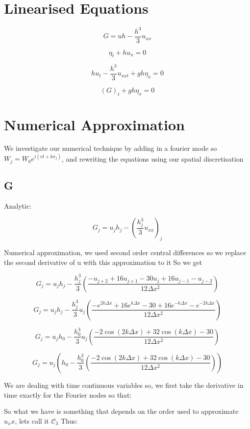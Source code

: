 \documentclass[12pt]{article}
\begin{document}
\section{Linearised Equations}



\[G = uh  -  \frac{h^3}{3} u_{xx}\]

\[\eta_t + h u_x = 0\]

\[h u_t - \frac{h^3}{3} u_{xxt}  + gh \eta_x  = 0\]

\[ \left(G\right)_t  + gh \eta_x  = 0\]

\section{Numerical Approximation}

We investigate our numerical technique by adding in a fourier mode so $W_j = W_0 e^{ i\left(vt + kx_j\right)}$, and rewriting the equations using our spatial discretisation

\subsection{G}

Analytic:

\[G_j = u_jh _j  -  (\frac{h_j^3}{3} {u_{xx}})_j\]

Numerical approximation, we used second order central differences so we replace the second derivative of u with this approximation to it
So we get

\[G_j = u_jh _j  -  \frac{h_j^3}{3} \left(\dfrac{-u_{j+2} + 16u_{j+1} - 30 u_{j} +16 u_{j-1} - u_{j-2}}{12\Delta x^2}\right)\]

\[G_j = u_jh _j  -  \frac{h_j^3}{3}u_j \left(\dfrac{-e^{2k\Delta x} + 16e^{k\Delta x} - 30 +16 e^{-k\Delta x} - e^{-2k\Delta x}}{12\Delta x^2}\right)\]

\[G_j = u_jh _0  -  \frac{h_0^3}{3}u_j \left(\dfrac{-2\cos\left(2k\Delta x\right) + 32\cos\left(k\Delta x \right) - 30 }{12\Delta x^2}\right)\]


\[G_j = u_j \left( h_0 -  \frac{h_0^3}{3} \left(\dfrac{-2\cos\left(2k\Delta x\right) + 32\cos\left(k\Delta x \right) - 30 }{12\Delta x^2}\right) \right)\]



We are dealing with time continuous  variables so, we first take the derivative in time exactly for the Fourier nodes so that:

So what we have is something that depends on the order used to approximate $u_xx$, lets call it $\mathcal{C}_3$ Thus:
\end{document}
